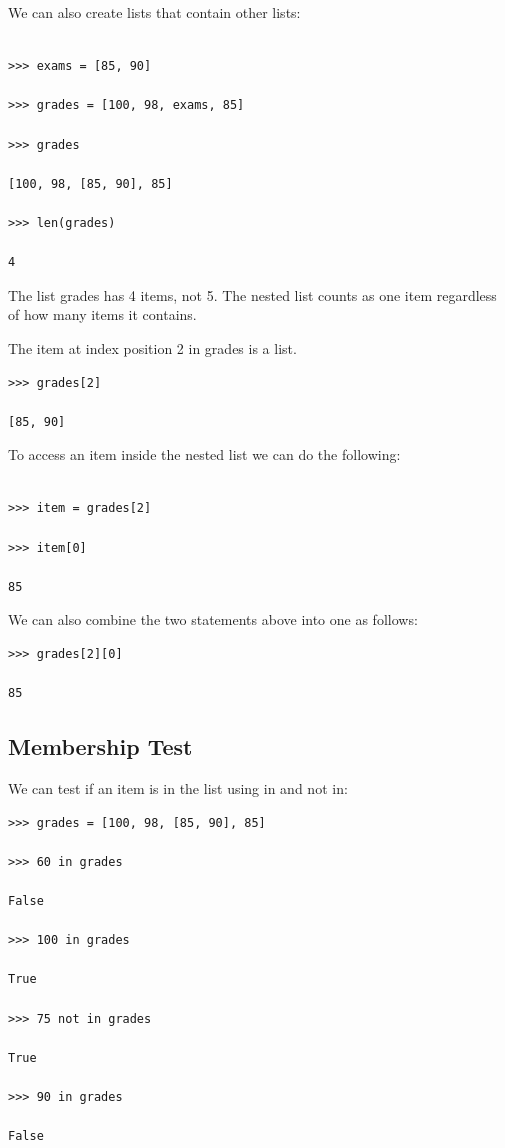 \documentclass{article}
\begin{document}
We can also create lists that contain  other lists:

\begin{lstlisting}

>>> exams = [85, 90]

>>> grades = [100, 98, exams, 85]

>>> grades

[100, 98, [85, 90], 85]

>>> len(grades)

4

\end{lstlisting}

The list grades has 4 items, not 5.  The nested list counts as one item regardless of how many items it contains.

The item at index position 2 in grades is a list.

\begin{lstlisting}
>>> grades[2]

[85, 90]

\end{lstlisting}

To access an item inside the nested list we can do the following:

\begin{lstlisting}

>>> item = grades[2]

>>> item[0]

85

\end{lstlisting}

We can also combine the two statements above into one as follows:

\begin{lstlisting}
>>> grades[2][0]

85

\end{lstlisting}

\subsection{Membership Test}

We can test if an item is in the list using in and not in:

\begin{lstlisting}
>>> grades = [100, 98, [85, 90], 85]

>>> 60 in grades

False

>>> 100 in grades

True

>>> 75 not in grades

True

>>> 90 in grades

False
\end{lstlisting}
\end{document}
